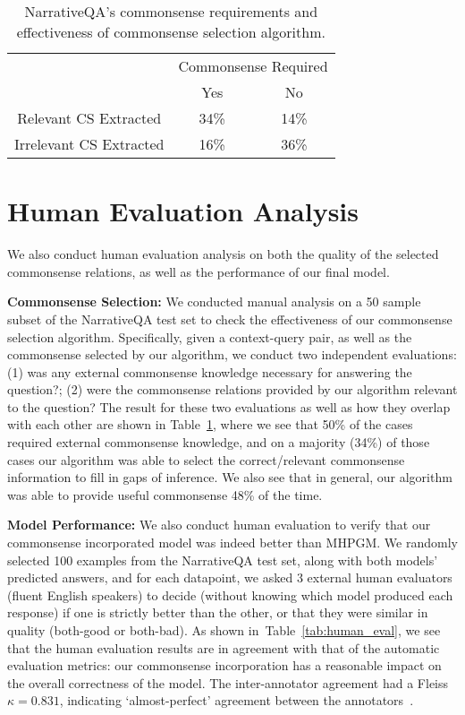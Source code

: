 \documentclass[11pt,a4paper]{article}
\def\tabref#1{Table~\ref{#1}}
\newcommand{\baselineAbbv}{MHPGM}
\begin{document}
  \begin{table}[t]
    \centering
    \begin{small}
    \begin{tabular}{ccc}
    \toprule
    & \multicolumn{2}{c}{Commonsense Required} \\
    & Yes & No \\\midrule
	Relevant CS Extracted& 34\% & 14\%\\
    Irrelevant CS Extracted & 16\%  & 36\% \\
    \bottomrule
    \end{tabular}
    \end{small}
    \vspace{-5pt}
    \caption{NarrativeQA's commonsense requirements and effectiveness of commonsense selection algorithm.}
    \label{tab:commonsense_an}
\end{table} \section{Human Evaluation Analysis}
\label{sec:discussion}
We also conduct human evaluation analysis on both the quality of the selected commonsense relations, as well as the performance of our final model.

\noindent\textbf{Commonsense Selection:} We conducted manual analysis on a 50 sample subset of the NarrativeQA test set to check the effectiveness of our commonsense selection algorithm.
Specifically, given a context-query pair, as well as the commonsense selected by our algorithm, we conduct two independent evaluations: (1) was any external commonsense knowledge necessary for answering the question?; (2) were the commonsense relations provided by our algorithm relevant to the question? 
The result for these two evaluations as well as how they overlap with each other are shown in \tabref{tab:commonsense_an}, where we see that 50\% of the cases required external commonsense knowledge, and on a majority (34\%) of those cases our algorithm was able to select the correct/relevant commonsense information to fill in gaps of inference.
We also see that in general, our algorithm was able to provide useful commonsense 48\% of the time.

\noindent\textbf{Model Performance:}
We also conduct human evaluation to verify that our commonsense incorporated model was indeed better than \baselineAbbv.
We randomly selected 100 examples from the NarrativeQA test set,
along with both models' predicted answers, and for each datapoint, we
asked 3 external human evaluators (fluent English speakers) to decide (without knowing
which model produced each response) if one is strictly better than the other, or
that they were similar in quality (both-good or both-bad).
As shown in~\tabref{tab:human_eval}, we see that the human evaluation
results are in agreement with that of the automatic evaluation metrics: our
commonsense incorporation has a reasonable impact on the overall
correctness of the model. The inter-annotator agreement had a Fleiss
$\kappa = 0.831$, indicating `almost-perfect' agreement between the
annotators~\cite{landis1977measurement}.
\end{document}
